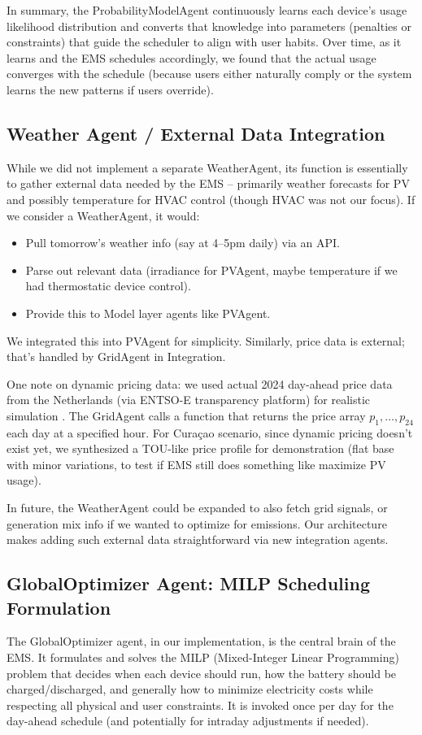 \documentclass[12pt,a4paper]{article}
\begin{document}
In summary, the ProbabilityModelAgent continuously learns each device’s usage likelihood distribution and converts that knowledge into parameters (penalties or constraints) that guide the scheduler to align with user habits. Over time, as it learns and the EMS schedules accordingly, we found that the actual usage converges with the schedule (because users either naturally comply or the system learns the new patterns if users override).

\subsection{Weather Agent / External Data Integration}
While we did not implement a separate WeatherAgent, its function is essentially to gather external data needed by the EMS – primarily weather forecasts for PV and possibly temperature for HVAC control (though HVAC was not our focus). If we consider a WeatherAgent, it would:
\begin{itemize}
    \item Pull tomorrow’s weather info (say at 4–5pm daily) via an API.
    \item Parse out relevant data (irradiance for PVAgent, maybe temperature if we had thermostatic device control).
    \item Provide this to Model layer agents like PVAgent.
\end{itemize}
We integrated this into PVAgent for simplicity. Similarly, price data is external; that’s handled by GridAgent in Integration.

One note on dynamic pricing data: we used actual 2024 day-ahead price data from the Netherlands (via ENTSO-E transparency platform) for realistic simulation \cite{TostadoVeliz2023}. The GridAgent calls a function that returns the price array $p_1,\dots,p_{24}$ each day at a specified hour. For Curaçao scenario, since dynamic pricing doesn't exist yet, we synthesized a TOU-like price profile for demonstration (flat base with minor variations, to test if EMS still does something like maximize PV usage).

In future, the WeatherAgent could be expanded to also fetch grid signals, or generation mix info if we wanted to optimize for emissions. Our architecture makes adding such external data straightforward via new integration agents.

\subsection{GlobalOptimizer Agent: MILP Scheduling Formulation}
The GlobalOptimizer agent, in our implementation, is the central brain of the EMS. It formulates and solves the MILP (Mixed-Integer Linear Programming) problem that decides when each device should run, how the battery should be charged/discharged, and generally how to minimize electricity costs while respecting all physical and user constraints. It is invoked once per day for the day-ahead schedule (and potentially for intraday adjustments if needed).
\end{document}
